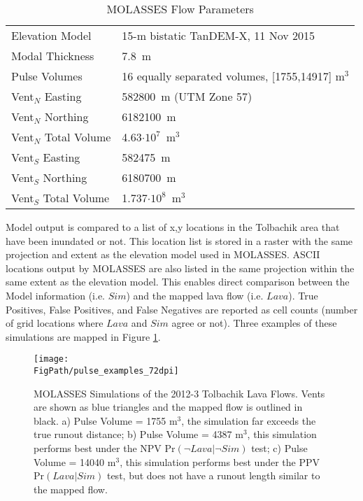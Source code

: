 		\begin{table}[h!]
		\centering
			\caption{MOLASSES Flow Parameters}
			\begin{tabular}{l l}
				\toprule
				Elevation Model & 15-m bistatic TanDEM-X, 11 Nov 2015\\
				Modal Thickness & 7.8~m\\
				Pulse Volumes & 16 equally separated volumes, [1755,14917] m$^3$\\
				\midrule
				Vent$_N$ Easting & 582800~m (UTM Zone 57)\\
				Vent$_N$ Northing & 6182100~m\\
				Vent$_N$ Total Volume & 4.63$\cdot10^7$~m$^3$\\
				\midrule
				Vent$_S$ Easting & 582475~m\\
				Vent$_S$ Northing & 6180700~m\\
				Vent$_S$ Total Volume & 1.737$\cdot10^8$~m$^3$\\
				\bottomrule
			\end{tabular}
			\label{tab_parameters_pulsebayes}
		\end{table}
		

		Model output is compared to a list of x,y locations in the Tolbachik area that have been inundated or not. This location list is stored in a raster with the same projection and extent as the elevation model used in MOLASSES. ASCII locations output by MOLASSES are also listed in the same projection within the same extent as the elevation model. This enables direct comparison between the Model information (i.e. $Sim$) and the mapped lava flow (i.e. $Lava$). True Positives, False Positives, and False Negatives are reported as cell counts (number of grid locations where $Lava$ and $Sim$ agree or not). Three examples of these simulations are mapped in Figure \ref{fig:pulse_map}.

		\begin{figure}
		\centering
		\texttt{[image: \\FigPath/pulse\_examples\_72dpi]}
		\caption[MOLASSES Simulations with different Pulse Volume parameter values of the 2012-3 Tolbachik Lava Flows]{MOLASSES Simulations of the 2012-3 Tolbachik Lava Flows. Vents are shown as blue triangles and the mapped flow is outlined in black. a) Pulse Volume = 1755 m$^3$, the simulation far exceeds the true runout distance; b) Pulse Volume = 4387 m$^3$, this simulation performs best under the NPV $\text{Pr}(\neg Lava|\neg Sim)$ test; c) Pulse Volume = 14040 m$^3$, this simulation performs best under the PPV $\text{Pr}(Lava|Sim)$ test, but does not have a runout length similar to the mapped flow.}
		\label{fig:pulse_map}
		\end{figure}

